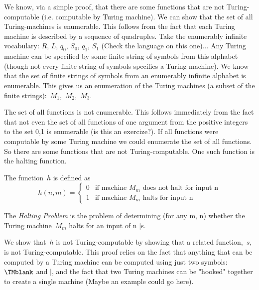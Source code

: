 \documentclass[../../include/open-logic-section]{subfiles}
\begin{document}

\begin{explain}
We know, via a simple proof, that there are some functions that are not
Turing-computable (i.e. computable by Turing machine).
We can show that the set of all Turing-machines is enumerable. This follows
from the fact that each Turing machine is described by a sequence of
quadruples. Take the enumerably infinite vocabulary: $R$, $L$, $q_0$,
$S_0$, $q_1$, $S_1$ (Check the language on this one)... Any Turing machine
can be specified by some finite string of symbols from this alphabet
(though not every finite string of symbols specifies a Turing machine). We
know that the set of finite strings of symbols from an enumerably infinite
alphabet is enumerable. This gives us an enumeration of the Turing machines
(a subset of the finite strings):~$M_1$,~$M_2$,~$M_3$.

The set of all functions is not enumerable. This follows immediately from
the fact that not even the set of all functions of one argument from the
positive integers to the set {0,1} is enumerable (is this an exercize?). If
all functions were computable by some Turing machine we could enumerate the
set of all functions. So there are some functions that are not
Turing-computable. One such function is the halting function.
\end{explain}

\begin{defn} The function~$h$ is defined as
\[
h(n,m) =
\begin{cases}
  \text{0} & \text{if machine~$M_m$ does not halt for input n} \\
  \text{1} & \text{if machine~$M_m$ halts for input n}
\end{cases}
\]
\end{defn}

\begin{defn}
The \emph{Halting Problem} is the problem of determining (for any m, n)
whether the Turing machine~$M_m$ halts for an input of n $\mid$s.
\end{defn}

\begin{explain}
We show that~$h$ is not Turing-computable by showing that a related
function,~$s$, is not Turing-computable. This proof relies on the fact that
anything that can be computed by a Turing machine can be computed using
just two symbols: $\TMblank$ and $\mid$, and the fact that two Turing
machines can be "hooked" together to create a single machine (Maybe an
example could go here).
\end{explain}
\end{document}
